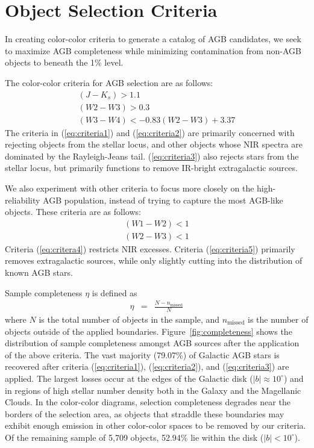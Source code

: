 \section{Object Selection Criteria}
\label{sec:criteria}
In creating color-color criteria to generate a catalog of AGB candidates, we seek to maximize AGB completeness while minimizing contamination from non-AGB objects to beneath the 1\% level.

The color-color criteria for AGB selection are as follows:
\begin{align} 
	(J-K_s) > 1.1\label{eq:criteria1}\\
	(W2-W3) > 0.3\label{eq:criteria2}\\
	(W3-W4) < -0.83(W2-W3) + 3.37\label{eq:criteria3}
\end{align}
The criteria in (\ref{eq:criteria1}) and (\ref{eq:criteria2}) are primarily concerned with rejecting objects from the stellar locus, and other objects whose NIR spectra are dominated by the Rayleigh-Jeans tail. (\ref{eq:criteria3}) also rejects stars from the stellar locus, but primarily functions to remove IR-bright extragalactic sources.

We also experiment with other criteria to focus more closely on the high-reliability AGB population, instead of trying to capture the most AGB-like objects. These criteria are as follows:
\begin{align} 
	(W1-W2) < 1\label{eq:criteria4}\\
	(W2-W3) < 1\label{eq:criteria5}
\end{align}
Criteria (\ref{eq:critera4}) restricts NIR excesses. Criteria (\ref{eq:criteria5}) primarily removes extragalactic sources, while only slightly cutting into the distribution of known AGB stars.

\noindent Sample completeness $\eta$ is defined as
\begin{eqnarray*}
\eta &=& \frac{N - n_\text{missed}}{N}
\end{eqnarray*}
where $N$ is the total number of objects in the sample, and $n_\text{missed}$ is the number of objects outside of the applied boundaries. Figure~\ref{fig:completeness} shows the distribution of sample completeness amongst AGB sources after the application of the above criteria. The vast majority (79.07\%) of Galactic AGB stars is recovered after criteria (\ref{eq:criteria1}), (\ref{eq:criteria2}), and (\ref{eq:criteria3}) are applied. The largest losses occur at the edges of the Galactic disk ($\lvert b\rvert\approx10^\circ$) and in regions of high stellar number density both in the Galaxy and the Magellanic Clouds. In the color-color diagrams, selection completeness degrades near the borders of the selection area, as objects that straddle these boundaries may exhibit enough emission in other color-color spaces to be removed by our criteria. Of the remaining sample of 5,709 objects, 52.94\% lie within the disk ($\lvert b\rvert<10^\circ$).

